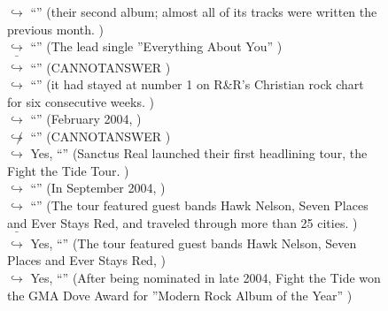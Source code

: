 \documentclass[11pt,a4paper, onecolumn]{article}
\begin{document}
\begin{figure}[t] \small \begin{tcolorbox}[boxsep=0pt,left=5pt,right=0pt,top=2pt,colback = yellow!5] \begin{dialogue}
 \small 
\colorbox{pink!25}{$\hookrightarrow$}
{ ``'' (their second album; almost all of its tracks were written the previous month. ) }
\\
\colorbox{pink!25}{$\hookrightarrow$}
{ ``'' (The lead single ''Everything About You'' ) }
\\
\colorbox{pink!25}{ $\bar{\hookrightarrow}$}
{ ``'' (CANNOTANSWER ) }
\\
\colorbox{pink!25}{$\hookrightarrow$}
{ ``'' (it had stayed at number 1 on R&R's Christian rock chart for six consecutive weeks. ) }
\\
\colorbox{pink!25}{$\hookrightarrow$}
{ ``'' (February 2004, ) }
\\
\colorbox{pink!25}{$\not\hookrightarrow$}
{ ``'' (CANNOTANSWER ) }
\\
\colorbox{pink!25}{$\hookrightarrow$}
\colorbox{red!25}{Yes,}
{ ``'' (Sanctus Real launched their first headlining tour, the Fight the Tide Tour. ) }
\\
\colorbox{pink!25}{$\hookrightarrow$}
{ ``'' (In September 2004, ) }
\\
\colorbox{pink!25}{$\hookrightarrow$}
{ ``'' (The tour featured guest bands Hawk Nelson, Seven Places and Ever Stays Red, and traveled through more than 25 cities. ) }
\\
\colorbox{pink!25}{ $\bar{\hookrightarrow}$}
\colorbox{red!25}{Yes,}
{ ``'' (The tour featured guest bands Hawk Nelson, Seven Places and Ever Stays Red, ) }
\\
\colorbox{pink!25}{$\hookrightarrow$}
\colorbox{red!25}{Yes,}
{ ``'' (After being nominated in late 2004, Fight the Tide won the GMA Dove Award for ''Modern Rock Album of the Year'' ) }
\\
 \end{dialogue}\end{tcolorbox}\end{figure}
\end{document}
